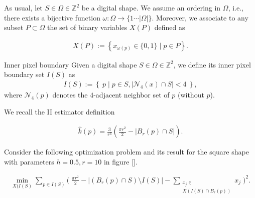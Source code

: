 As usual, let $S \in \Omega \in \mathbb{Z}^2$ be a digital shape. We assume an ordering in $\Omega$, i.e., there exists a bijective function $\omega : \Omega \rightarrow \{1 \cdots |\Omega| \}$. Moreover, we associate to any subset $P \subset \Omega$ the set of binary variables $X(P)$ defined as

\begin{align*}
	X(P) := \left\{ x_{\omega(p)} \in \{0,1\} \; | \; p \in P \right\}.
\end{align*}

\begin{definition}{Inner pixel boundary}
Given a digital shape $S \in \Omega \in \mathbb{Z}^2$, we define its inner pixel boundary set $I(S)$ as
\begin{align*}
	I(S) := \left\{ \: p \; | \; p \in S, |\mathcal{N}_4(x) \cap S|<4 \: \right\},
\end{align*}
where $\mathcal{N}_4(p)$ denotes the $4$-adjacent neighbor set of $p$ (without $p$).
\end{definition}


We recall the II estimator definition

\begin{align*}
	\hat{k}(p) = \frac{3}{r^3}\left( \frac{\pi r^2}{2} - |B_r(p) \cap S| \right).
\end{align*}

Consider the following optimization problem and its result for the square shape with parameters $h=0.5,r=10$ in figure \ref{}.

\begin{align}
	\min_{X(I(S)} \sum_{p \in I(S)}{ \Big( \; \frac{\pi r^2}{2} - | (B_r(p) \cap S) \setminus I(S) | - \sum_{ \substack{x_j \in \\ X( I(S) \cap B_r(p))}}{x_j} \; \Big)^2}.
	\label{eq:naive-opt-problem}
\end{align}


